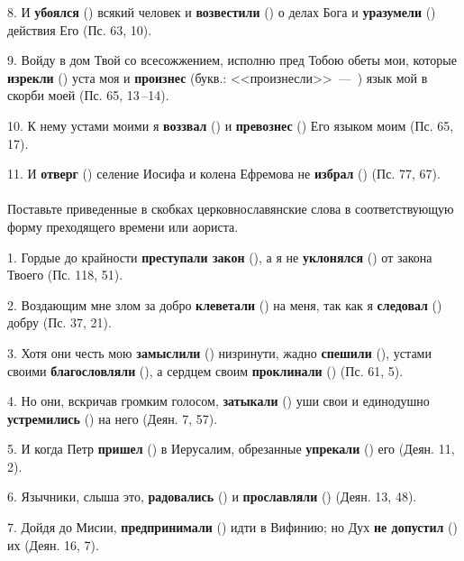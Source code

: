 \documentclass[11pt,a4paper,oneside]{memoir}
\newcommand{\exercise}{}
\begin{document}
8. И \textbf{убоялся} ({}) всякий человек и
\textbf{возвестили} ({}) о делах Бога и
\textbf{уразумели} ({}) действия Его (Пс. 63, 10).

9. Войду в дом Твой со всесожжением, исполню пред Тобою обеты мои,
которые \textbf{изрекли} ({}) уста моя и
\textbf{произнес} (букв.: <<произнесли>>~---~{}) язык
мой в скорби моей (Пс. 65, 13\,--14).

10. К нему устами моими я \textbf{воззвал} ({}) и
\textbf{превознес} ({}) Его языком моим (Пс. 65, 17).

11. И \textbf{отверг} ({}) селение Иосифа и колена
Ефремова не \textbf{избрал} ({}) (Пс. 77, 67).

\paragraph{\exercise}

Поставьте приведенные в скобках церковнославянские слова в
соответствующую форму преходящего времени или аориста.

1. Гордые до крайности \textbf{преступали закон}
({}), а я не \textbf{уклонялся}
({}) от закона Твоего (Пс. 118, 51).

2. Воздающим мне злом за добро \textbf{клеветали}
({}) на меня, так как я \textbf{следовал}
({}) добру (Пс. 37, 21).

3. Хотя они честь мою \textbf{замыслили} ({})
низринути, жадно \textbf{спешили} ({}), устами своими
\textbf{благословляли} ({}), а сердцем своим
\textbf{проклинали} ({}) (Пс. 61, 5).

4. Но они, вскричав громким голосом, \textbf{затыкали}
({}) уши свои и единодушно \textbf{устремились}
({}) на него (Деян. 7, 57).

5. И когда Петр \textbf{пришел} ({}) в Иерусалим,
обрезанные \textbf{упрекали} ({}) его (Деян. 11, 2).

6. Язычники, слыша это, \textbf{радовались} ({}) и
\textbf{прославляли} ({}) (Деян. 13, 48).

7. Дойдя до Мисии, \textbf{предпринимали} ({}) идти
в Вифинию; но Дух \textbf{не допустил} ({}) их (Деян. 16, 7).
\end{document}
